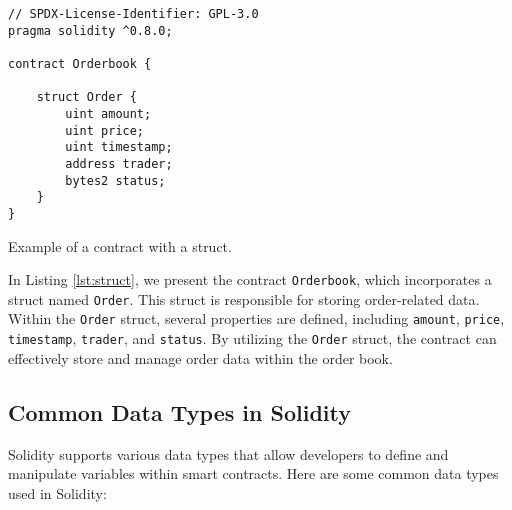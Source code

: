 \begin{listing}[!ht]
    \begin{verbatim}
// SPDX-License-Identifier: GPL-3.0
pragma solidity ^0.8.0;

contract Orderbook {

    struct Order {
        uint amount;
        uint price;
        uint timestamp;
        address trader;
        bytes2 status;
    }
}
    \end{verbatim}
    \caption{Example of a contract with a struct.}
    \label{lst:struct}
\end{listing}

In Listing \ref{lst:struct}, we present the contract \texttt{Orderbook}, which incorporates a struct named \texttt{Order}. 
This struct is responsible for storing order-related data. Within the \texttt{Order} struct, several properties are defined, including \texttt{amount}, \texttt{price}, 
\texttt{timestamp}, \texttt{trader}, and \texttt{status}. By utilizing the \texttt{Order} struct, the contract can effectively store and manage order data within the 
order book.


\subsection{Common Data Types in Solidity}

Solidity supports various data types that allow developers to define and manipulate variables within smart contracts. Here are some common data types used in Solidity:

